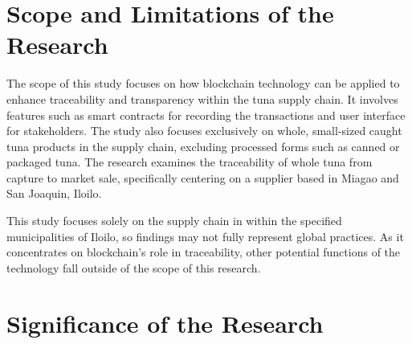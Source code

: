 \section{Scope and Limitations of the Research}
\label{sec:scopelimitations}

The scope of this study focuses on how blockchain technology can be applied to enhance traceability and transparency within the tuna supply chain. It involves features such as smart contracts for recording the transactions and user interface for stakeholders. The study also focuses exclusively on whole, small-sized caught tuna products in the supply chain, excluding processed forms such as canned or packaged tuna. The research examines the traceability of whole tuna from capture to market sale, specifically centering on a supplier based in Miagao and San Joaquin, Iloilo. 

\noindent This study focuses solely on the supply chain in within the specified municipalities of Iloilo, so findings may not fully represent global practices. As it concentrates on blockchain's role in traceability, other potential functions of the technology fall outside of the scope of this research.


\begin{comment}

%
%
Generally, one paragraph should be allotted for each of your research objectives.

Each paragraph contains a brief overview of the concept/theory and the purpose of doing the associated objective.

Each paragraph also includes a description of the scope/limitation of your study.

* Please refer to the slides for examples.

\end{comment}


\section{Significance of the Research}
\label{sec:significance}

